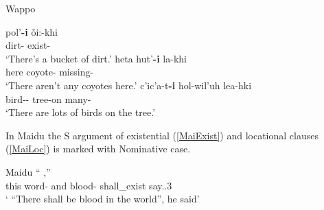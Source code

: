 \begin{exe} \ex\label{WapExist}  {Wappo} \citep[Wappo-Yukian; California; ][105]{Thompsonetal:2006}\nopagebreak[4]
\begin{xlist}
 \ex\gll pol'\textbf{-i} \v oi:-khi\textglotstop\\
 dirt-\nom{} exist-\stat{}\\
\glt `There's a bucket of dirt.'
  \ex\gll heta hut'\textbf{-i} la-khi\textglotstop\\
 here coyote-\nom{} missing-\stat{}\\
\glt `There aren't any coyotes here.'
 \ex\gll c'ic'a-t\textbf{-i} hol-wil'uh le\textglotstop a-hki\textglotstop\\
 bird-\pl{}-\nom{} tree-on many-\stat{}\\
\glt `There are lots of birds on the tree.'
 
\end{xlist}
\end{exe}

In Maidu the S argument of existential (\ref{MaiExist}) and locational clauses (\ref{MaiLoc}) is marked with Nominative case.  

\begin{exe}\ex\label{MaiExist}  {Maidu} \citetext{Maiduan; California; \citealt[10]{Maidu:1912}}\nopagebreak[4]
\gll ``    ,'' \\
this word-\loc{} and blood-\nom{} shall\_exist say.\pst{}.3\sg{}\\
\glt ` ``There shall be blood in the world'', he said' 
\end{exe}
 


